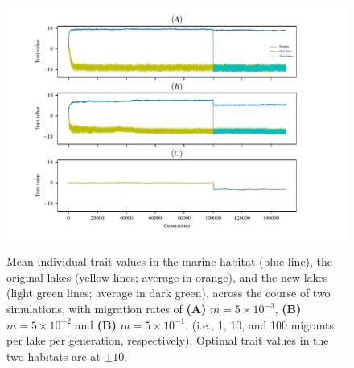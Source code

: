 \documentclass{article}
\begin{document}
\begin{figure}
	\begin{center}
  		\includegraphics[width=1.0\linewidth]{Final_Plots/Pheno_Time_supp.pdf}
  		\caption{
		Mean individual trait values in the marine habitat (blue line),
        		the original lakes (yellow lines; average in orange),
        		and the new lakes (light green lines; average in dark green),
        		across the course of two simulations, with migration rates of
        		\textbf{(A)} $m=5 \times 10^{-3}$,
        		\textbf{(B)} $m=5 \times 10^{-2}$ and
		\textbf{(B)} $m=5 \times 10^{-1}$.
        		(i.e., 1, 10, and 100 migrants per lake per generation, respectively).
        		Optimal trait values in the two habitats are at $\pm 10$.
		}
  		\label{fig:phenotype_time_supp}
	\end{center}
\end{figure}
\end{document}
